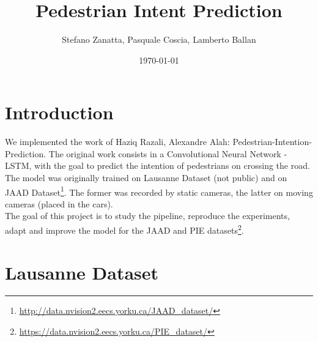 \documentclass[11pt]{article}
\title{Pedestrian Intent Prediction}
\author{Stefano Zanatta, Pasquale Coscia, Lamberto Ballan}
\date{\today}
\begin{document}
\maketitle


\section{Introduction}
    We implemented the work of Haziq Razali, Alexandre Alah:
    Pedestrian-Intention-Prediction\cite{PedestrianIP}.
    The original work consists in a Convolutional Neural Network - LSTM, with the goal to predict the intention
    of pedestrians on crossing the road.\\
    The model was originally trained on Lausanne Dataset (not public) and on JAAD Dataset\footnote{\url{http://data.nvision2.eecs.yorku.ca/JAAD_dataset/}}.
    The former was recorded by static cameras, the latter on moving cameras (placed in the cars).\\
    The goal of this project is to study the pipeline, reproduce the experiments, adapt and
    improve the model for the JAAD and PIE datasets\footnote{\url{https://data.nvision2.eecs.yorku.ca/PIE_dataset/}}.

\section{Lausanne Dataset}
\end{document}
